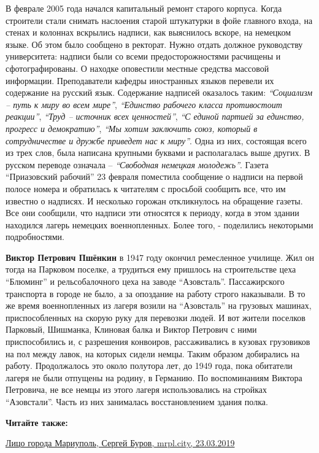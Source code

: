 В феврале 2005 года начался капитальный ремонт старого корпуса. Когда строители
стали снимать наслоения старой штукатурки в фойе главного входа, на стенах и
колоннах вскрылись надписи, как выяснилось вскоре, на немецком языке. Об этом
было сообщено в ректорат. Нужно отдать должное руководству университета:
надписи были со всеми предосторожностями расчищены и сфотографированы. О
находке оповестили местные средства массовой информации. Преподаватели кафедры
иностранных языков перевели их содержание на русский язык. Содержание надписей
оказалось таким: \emph{\enquote{Социализм – путь к миру во всем мире}}, \emph{\enquote{Единство рабочего
класса противостоит реакции}}, \emph{\enquote{Труд – источник всех ценностей}}, \emph{\enquote{С единой
партией за единство, прогресс и демократию}}, \emph{\enquote{Мы хотим заключить союз, который
в сотрудничестве и дружбе приведет нас к миру}}. Одна из них, состоящая всего из
трех слов, была написана крупными буквами и располагалась выше других. В
русском переводе означала – \emph{\enquote{Свободная немецкая молодежь}}. Газета \enquote{Приазовский
рабочий} 23 февраля поместила сообщение о надписи на первой полосе номера и
обратилась к читателям с просьбой сообщить все, что им известно о надписях. И
несколько горожан откликнулось на обращение газеты. Все они сообщили, что
надписи эти относятся к периоду, когда в этом здании находился лагерь немецких
военнопленных. Более того, - поделились некоторыми подробностями.

\textbf{Виктор Петрович Пшёнкин} в 1947 году окончил ремесленное училище. Жил он тогда
на Парковом поселке, а трудиться ему пришлось на строительстве цеха \enquote{Блюминг} и
рельсобалочного цеха на заводе \enquote{Азовсталь}. Пассажирского транспорта в городе
не было, а за опоздание на работу строго наказывали. В то же время
военнопленных из лагеря возили на \enquote{Азовсталь} на грузовых машинах,
приспособленных на скорую руку для перевозки людей. И вот жители поселков
Парковый, Шишманка, Клиновая балка и Виктор Петрович с ними приспособились и, с
разрешения конвоиров, рассаживались в кузовах грузовиков на пол между лавок, на
которых сидели немцы. Таким образом добирались на работу. Продолжалось это
около полутора лет, до 1949 года, пока обитатели лагеря не были отпущены на
родину, в Германию. По воспоминаниям Виктора Петровича, не все немцы из этого
лагеря использовались на стройках \enquote{Азовстали}. Часть из них занималась
восстановлением здания полка.

\textbf{Читайте также:} 

\href{https://archive.org/details/23_03_2019.sergij_burov.mrpl_city.lico_goroda_mariupol}{%
Лицо города Мариуполь, Сергей Буров, mrpl.city, 23.03.2019}

